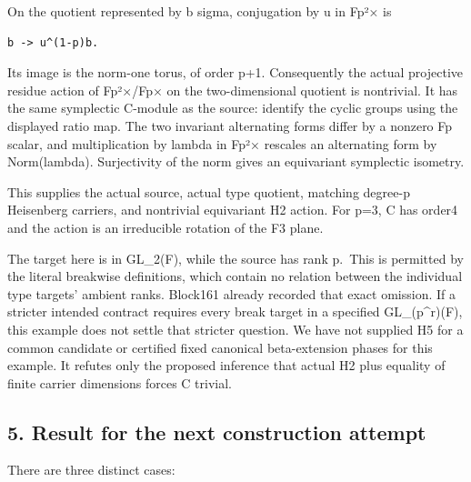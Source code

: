 On the quotient represented by b sigma, conjugation by u in Fp²× is

\begin{Verbatim}[fontsize=\small,breaklines=true,breakanywhere=true]
b -> u^(1-p)b.
\end{Verbatim}

Its image is the norm-one torus, of order p+1. Consequently the actual
projective residue action of Fp²×/Fp× on the two-dimensional quotient is
nontrivial. It has the same symplectic C-module as the source: identify
the cyclic groups using the displayed ratio map. The two invariant
alternating forms differ by a nonzero Fp scalar, and multiplication by
lambda in Fp²× rescales an alternating form by Norm(lambda).
Surjectivity of the norm gives an equivariant symplectic isometry.

This supplies the actual source, actual type quotient, matching degree-p
Heisenberg carriers, and nontrivial equivariant H2 action. For p=3, C
has order4 and the action is an irreducible rotation of the F3 plane.

The target here is in GL\_2(F), while the source has rank p.~This is
permitted by the literal breakwise definitions, which contain no
relation between the individual type targets' ambient ranks. Block161
already recorded that exact omission. If a stricter intended contract
requires every break target in a specified GL\_(p\^{}r)(F), this example
does not settle that stricter question. We have not supplied H5 for a
common candidate or certified fixed canonical beta-extension phases for
this example. It refutes only the proposed inference that actual H2 plus
equality of finite carrier dimensions forces C trivial.

\hypertarget{stabilizer_contract-result-for-the-next-construction-attempt}{%
\subsection{5. Result for the next construction
attempt}\label{stabilizer_contract-result-for-the-next-construction-attempt}}

There are three distinct cases:

